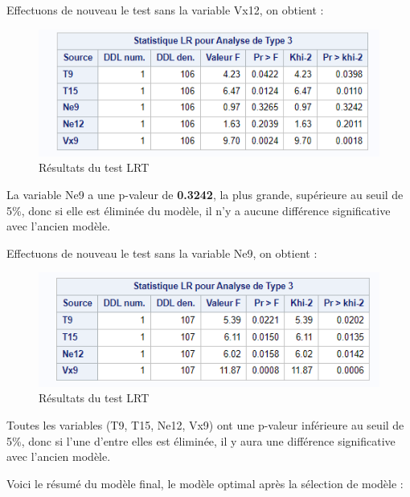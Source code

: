 \documentclass[12pt,a4paper]{article}
\begin{document}
Effectuons de nouveau le test sans la variable Vx12, on obtient :

\begin{figure}[H]
	\centering
	\includegraphics[width=\textwidth]{LRT_4.PNG}
	\caption{Résultats du test LRT}
	\label{fig:resultats_lrt4}
\end{figure}

La variable Ne9 a une p-valeur de \textbf{0.3242}, la plus grande, supérieure au seuil de 5\%, donc si elle est éliminée du modèle, il n'y a aucune différence significative avec l'ancien modèle.

Effectuons de nouveau le test sans la variable Ne9, on obtient :

\begin{figure}[H]
	\centering
	\includegraphics[width=\textwidth]{LRT_5.PNG}
	\caption{Résultats du test LRT}
	\label{fig:resultats_lrt5}
\end{figure}

Toutes les variables (T9, T15, Ne12, Vx9) ont une p-valeur inférieure au seuil de 5\%, donc si l'une d'entre elles est éliminée, il y aura une différence significative avec l'ancien modèle.

Voici le résumé du modèle final, le modèle optimal après la sélection de modèle :
\end{document}
